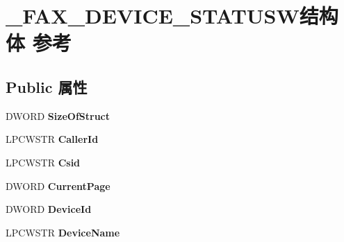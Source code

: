 \hypertarget{struct___f_a_x___d_e_v_i_c_e___s_t_a_t_u_s_w}{}\section{\+\_\+\+F\+A\+X\+\_\+\+D\+E\+V\+I\+C\+E\+\_\+\+S\+T\+A\+T\+U\+S\+W结构体 参考}
\label{struct___f_a_x___d_e_v_i_c_e___s_t_a_t_u_s_w}
\subsection*{Public 属性}
\begin{DoxyCompactItemize}
\item 
\mbox{\label{struct___f_a_x___d_e_v_i_c_e___s_t_a_t_u_s_w_a7151f29b6a997947b962f5e79a433af2}} 
D\+W\+O\+RD {\bfseries Size\+Of\+Struct}
\item 
\mbox{\label{struct___f_a_x___d_e_v_i_c_e___s_t_a_t_u_s_w_a63f945553a01d7b76c6de78ad1daf15f}} 
L\+P\+C\+W\+S\+TR {\bfseries Caller\+Id}
\item 
\mbox{\label{struct___f_a_x___d_e_v_i_c_e___s_t_a_t_u_s_w_aa38bb0cc5935218cb64d9bb6448d9b5d}} 
L\+P\+C\+W\+S\+TR {\bfseries Csid}
\item 
\mbox{\label{struct___f_a_x___d_e_v_i_c_e___s_t_a_t_u_s_w_a51c3333e1874a08fa8d859c1047b3f15}} 
D\+W\+O\+RD {\bfseries Current\+Page}
\item 
\mbox{\label{struct___f_a_x___d_e_v_i_c_e___s_t_a_t_u_s_w_a2caffb9abe09f7fcdb61e1194f6bf561}} 
D\+W\+O\+RD {\bfseries Device\+Id}
\item 
\mbox{\label{struct___f_a_x___d_e_v_i_c_e___s_t_a_t_u_s_w_aeda1105555b67374f0817fe6db0443e5}} 
L\+P\+C\+W\+S\+TR {\bfseries Device\+Name}
\item 
\mbox{\label{struct___f_a_x___d_e_v_i_c_e___s_t_a_t_u_s_w_a4cb061eb845270e6764d32fd6fac4310}} 

\end{DoxyCompactItemize}
